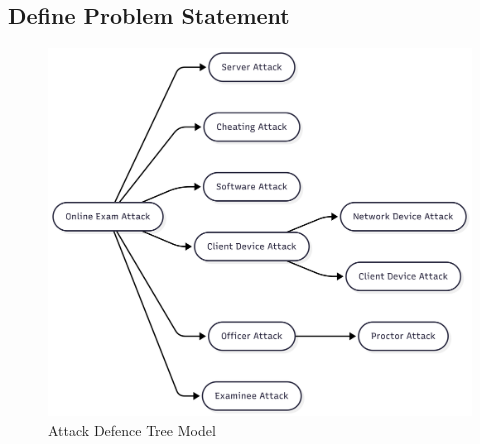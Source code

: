\subsection{Define Problem Statement}
 \begin{figure}[H] 
	     \centering%
	     \includegraphics[width=12cm]{figure/atk-def-online-exam.png}
	     \caption{Attack Defence Tree Model \citet{rosmansyah2019attackdefensetreeonaeexamsystem}}
     \label{fig:attack-defend-tree-model}
 \end{figure}


